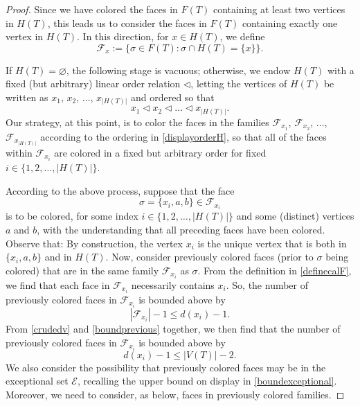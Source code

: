 \documentclass[10pt,a4paper]{amsart}
\begin{document}
\begin{proof}
 Since we have colored the faces in $F(T)$ containing at least two vertices in $H(T)$, 
 this leads us to consider the faces in $F(T)$ containing exactly one vertex in $H(T)$.
 In this direction, for $x \in H(T)$, we define
\begin{equation}\label{definecalF}
 \mathcal{F}_{x} := \{ \sigma \in F(T) : \sigma \cap H(T) = \{ x \} \}. 
\end{equation}
 
 If $H(T) = \varnothing$, the following stage is vacuous; otherwise, we endow $H(T)$ with a fixed (but arbitrary) linear order relation 
 $\triangleleft$, letting the vertices of $H(T)$ be written as $x_{1}$, $x_{2}$, $\ldots$, $x_{|H(T)|}$
 and ordered so that 
\begin{equation}\label{displayorderH} 
 x_{1} \triangleleft x_{2} \triangleleft \ldots \triangleleft x_{|H(T)|}.
\end{equation}
 Our strategy, at this point, is to 
 color the faces in the families 
 $\mathcal{F}_{x_{1}}$, $\mathcal{F}_{x_{2}}$, $\ldots$, $\mathcal{F}_{x_{|H(T)|}}$
 according to the ordering in \eqref{displayorderH}, 
 so that all of the faces within $\mathcal{F}_{x_{i}}$ are colored in a fixed but arbitrary order
 for fixed $i \in \{ 1, 2, \ldots, |H(T)| \}$. 

 According to the above process, suppose that 
 the face 
\begin{equation}\label{definesigma} 
 \sigma = \{ x_{i}, a, b \} \in \mathcal{F}_{x_{i}}
\end{equation}
 is to be colored, for some index 
 $i \in \{ 1, 2, \ldots, |H(T)| \}$ 
 and some (distinct) vertices $a$ and $b$, with the understanding that all preceding faces have been colored.
 Observe that: By construction, the vertex $x_i$ is the unique vertex that is both in $\{ x_i, a, b \}$ and in $H(T)$. 
 Now, consider previously colored faces (prior to $\sigma$ being colored) 
  that are in the same family $\mathcal{F}_{x_{i}}$ as $\sigma$. 
 From the definition in \eqref{definecalF}, 
 we find that each face in $\mathcal{F}_{x_{i}}$ necessarily contains $x_{i}$. 
 So, the number of previously colored faces
 in $\mathcal{F}_{x_{i}}$
 is bounded above by 
\begin{equation}\label{boundprevious} 
 \left| \mathcal{F}_{x_{i}} \right| - 1 \leq d(x_i) - 1. 
\end{equation} 
 From \eqref{crudedv} and \eqref{boundprevious} together,  we then find that the number of previously colored faces in 
  $\mathcal{F}_{x_{i}}$ is bounded above by 
\begin{equation}\label{upperVTminus2}
 d(x_{i}) - 1 \leq \left| V(T) \right| - 2.
\end{equation}
 We also consider the possibility that previously colored faces may be in the exceptional set $\mathcal{E}$, recalling the upper bound on 
 display in \eqref{boundexceptional}. Moreover, we need to consider, as below, faces in previously colored families. 


\end{proof}
\end{document}
